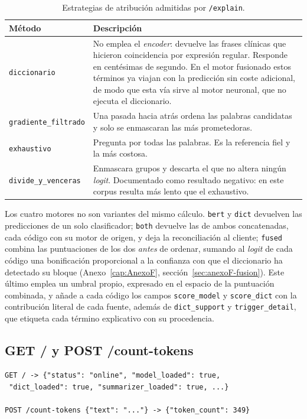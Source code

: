 \begin{table}[h]
\centering
\small
\caption{Estrategias de atribución admitidas por \texttt{/explain}.}
\label{tab:explain-metodos}
\begin{tabular}{p{3.3cm}p{9.5cm}}
\hline
\textbf{Método} & \textbf{Descripción} \\
\hline
\texttt{diccionario} & No emplea el \emph{encoder}: devuelve las frases clínicas que hicieron coincidencia por expresión regular. Responde en centésimas de segundo. En el motor fusionado estos términos ya viajan con la predicción sin coste adicional, de modo que esta vía sirve al motor neuronal, que no ejecuta el diccionario. \\
\texttt{gradiente\_filtrado} & Una pasada hacia atrás ordena las palabras candidatas y solo se enmascaran las más prometedoras. \\
\texttt{exhaustivo} & Pregunta por todas las palabras. Es la referencia fiel y la más costosa. \\
\texttt{divide\_y\_venceras} & Enmascara grupos y descarta el que no altera ningún \emph{logit}. Documentado como resultado negativo: en este corpus resulta más lento que el exhaustivo. \\
\hline
\end{tabular}
\end{table}

Los cuatro motores no son variantes del mismo cálculo. \texttt{bert} y \texttt{dict} devuelven las predicciones de un solo clasificador; \texttt{both} devuelve las de ambos concatenadas, cada código con su motor de origen, y deja la reconciliación al cliente; \texttt{fused} combina las puntuaciones de los dos \emph{antes} de ordenar, sumando al \emph{logit} de cada código una bonificación proporcional a la confianza con que el diccionario ha detectado su bloque (Anexo~\ref{cap:AnexoF}, sección~\ref{sec:anexoF-fusion}). Este último emplea un umbral propio, expresado en el espacio de la puntuación combinada, y añade a cada código los campos \texttt{score\_model} y \texttt{score\_dict} con la contribución literal de cada fuente, además de \texttt{dict\_support} y \texttt{trigger\_detail}, que etiqueta cada término explicativo con su procedencia.

\subsection{GET / y POST /count-tokens}

{\small
\begin{verbatim}
GET / -> {"status": "online", "model_loaded": true,
 "dict_loaded": true, "summarizer_loaded": true, ...}

POST /count-tokens {"text": "..."} -> {"token_count": 349}
\end{verbatim}
}


